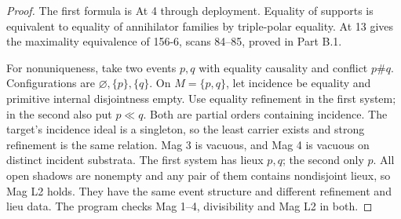 \begin{proof}
The first formula is At 4 through deployment.
Equality of supports is equivalent to equality of
annihilator families by triple-polar equality.
At 13 gives the maximality equivalence of 156-6,
scans 84--85, proved in Part B.1.

For nonuniqueness, take two events \(p,q\) with
equality causality and conflict \(p\#q\).
Configurations are \(\varnothing,\{p\},\{q\}\).
On \(M=\{p,q\}\), let incidence be equality
and primitive internal disjointness empty.
Use equality refinement in the first system;
in the second also put \(p\ll q\).
Both are partial orders containing incidence.
The target's incidence ideal is a singleton,
so the least carrier exists and strong
refinement is the same relation. Mag 3 is
vacuous, and Mag 4 is vacuous on distinct
incident substrata. The first system has
lieux \(p,q\); the second only \(p\).
All open shadows are nonempty and any
pair of them contains nondisjoint lieux,
so Mag L2 holds. They have the same
event structure and different refinement
and lieu data. The program checks Mag
1--4, divisibility and Mag L2 in both.
\end{proof}
